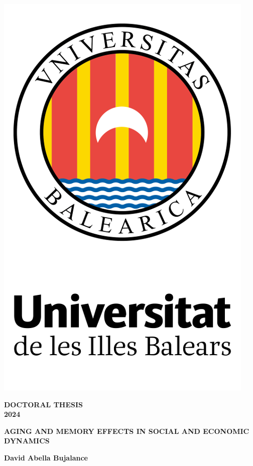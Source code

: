 \begin{titlepage}
    	\large

        \begin{center}
            \sffamily
            \includegraphics[width=.35\textwidth]{Figs/uib.png}
        
            \vspace*{.05\textheight}

			{\Huge\bfseries DOCTORAL THESIS} \\
			{\Huge \bfseries 2024}

            \vspace*{.15\textheight}

			\begingroup
				{\Huge\bfseries AGING AND MEMORY EFFECTS IN SOCIAL AND ECONOMIC DYNAMICS \par}
			\endgroup

            \vfill

            {\Large \bfseries David Abella Bujalance}
        \end{center}
\end{titlepage}